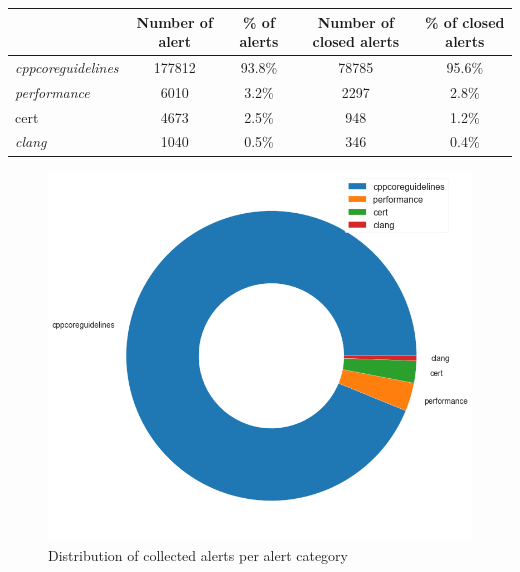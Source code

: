 \begin{table}[H]
	\centering
	\begin{tabular}{@{}lcccc@{}}
		\toprule
		& \textbf{Number of alert} & \textbf{\% of alerts} & \textbf{Number of closed alerts} & \textbf{\% of closed alerts} \\ \midrule
		\textit{cppcoreguidelines} & 177812                   & 93.8\%                & 78785                            & 95.6\%                       \\
		\textit{performance}       & 6010                     & 3.2\%                 & 2297                             & 2.8\%                        \\
		cert                       & 4673                     & 2.5\%                 & 948                              & 1.2\%                        \\
		\textit{clang}             & 1040                     & 0.5\%                 & 346                              & 0.4\%                        \\ \bottomrule
	\end{tabular}
\end{table}
\begin{figure}[H]
	\centering
	\includegraphics[scale=0.4]{./src/data_analysis/pie_alerts.png}
	\caption{Distribution of collected alerts per alert category}
	\label{data_analysis:collected_alerts}
\end{figure}

